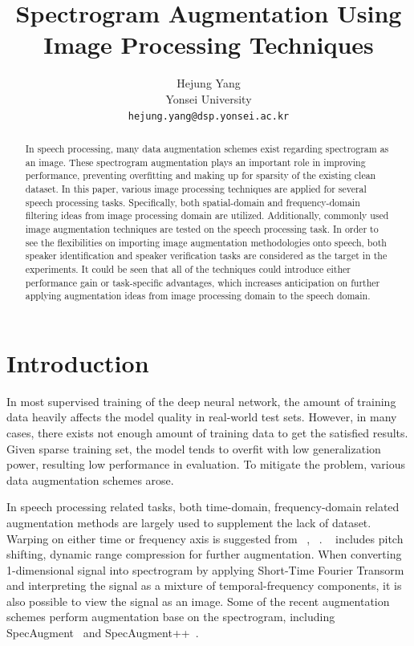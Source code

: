\documentclass[10pt,twocolumn,letterpaper]{article}
\begin{document}
\title{Spectrogram Augmentation Using Image Processing Techniques}

\author{Hejung Yang\\
Yonsei University\\
{\tt\small hejung.yang@dsp.yonsei.ac.kr}
}
\maketitle

\begin{abstract}
   In speech processing, many data augmentation schemes exist regarding spectrogram as an image.
   These spectrogram augmentation plays an important role in improving performance, preventing 
   overfitting and making up for sparsity of the existing clean dataset.
   In this paper, various image processing techniques are applied for several speech processing tasks.
   Specifically, both spatial-domain and frequency-domain filtering ideas from image processing domain 
   are utilized. Additionally, commonly used image augmentation techniques are tested on the speech 
   processing task. In order to see the flexibilities on importing image augmentation methodologies onto speech,
   both speaker identification and speaker verification tasks are considered as the target in the experiments.
   It could be seen that all of the techniques could introduce either performance gain or task-specific 
   advantages, which increases anticipation on further applying augmentation ideas from image processing domain to 
   the speech domain.
\end{abstract}

\section{Introduction}
\label{sec:intro}

In most supervised training of the deep neural network, the amount of training data heavily affects
the model quality in real-world test sets. However, in many cases, there exists not enough amount of 
training data to get the satisfied results. Given sparse training set, the model tends to overfit with low 
generalization power, resulting low performance in evaluation.
To mitigate the problem, various data augmentation schemes arose. 

In speech processing related tasks, both time-domain, frequency-domain related augmentation methods
are largely used to supplement the lack of dataset. Warping on either time or frequency axis is suggested 
from ~\cite{jaitly2013vocal}, ~\cite{ko2015audio}. ~\cite{salamon2017deep} includes pitch shifting, 
dynamic range compression for further augmentation. 
When converting 1-dimensional signal into spectrogram by applying Short-Time Fourier Transorm and 
interpreting the signal as a mixture of temporal-frequency
components, it is also possible to view the signal as an image. 
Some of the recent augmentation schemes perform augmentation base on the spectrogram, including 
SpecAugment~\cite{park2019specaugment} and SpecAugment++~\cite{wang2021specaugment++}.
\end{document}
